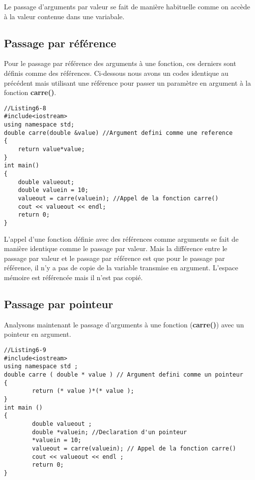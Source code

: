 \documentclass[a4paper, oneside,11pt]{book}
\begin{document}
Le passage d'arguments par valeur se fait de mani\`ere habituelle comme on acc\`ede \`a la valeur contenue dans une variabale.

\subsection{Passage par r\'ef\'erence}

Pour le passage par r\'ef\'erence des arguments \`a une fonction, ces derniers sont d\'efinis comme des r\'ef\'erences. Ci-dessous nous avons un codes identique au pr\'ec\'edent
mais utilisant une r\'ef\'erence pour passer un param\`etre en argument \`a la fonction \textbf{carre()}.

\begin{lstlisting}
//Listing6-8
#include<iostream>
using namespace std;
double carre(double &value) //Argument defini comme une reference
{
    return value*value;
}
int main()
{
    double valueout;
    double valuein = 10;
    valueout = carre(valuein); //Appel de la fonction carre()
    cout << valueout << endl;
    return 0;
}
\end{lstlisting}
L'appel d'une fonction d\'efinie avec des r\'ef\'erences comme arguments se 
fait de mani\`ere identique comme le passage par valeur. Mais la diff\'erence 
entre le passage par valeur et le passage par r\'ef\'erence est que pour le 
passage par r\'ef\'erence, il n'y a pas de copie de la variable transmise en 
argument. L'espace m\'emoire est r\'ef\'erenc\'ee mais il n'est pas copi\'e. 





\subsection{Passage par pointeur}

Analysons maintenant le passage d'arguments \`a une fonction (\textbf{carre()}) avec un pointeur en argument.

\begin{lstlisting}
//Listing6-9
#include<iostream>
using namespace std ;
double carre ( double * value ) // Argument defini comme un pointeur
{
        return (* value )*(* value );
}
int main ()
{
        double valueout ;
        double *valuein; //Declaration d'un pointeur
        *valuein = 10;
        valueout = carre(valuein); // Appel de la fonction carre()
        cout << valueout << endl ;
        return 0;
}
\end{lstlisting}
\end{document}
